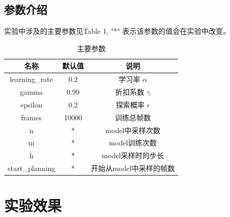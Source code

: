 \documentclass[a4paper,12pt]{article}
\begin{document}
\begin{CJK}{UTF8}{gbsn}
\subsection{参数介绍}
实验中涉及的主要参数见Table 1, "*" 表示该参数的值会在实验中改变。
\begin{table}[!h]
	\renewcommand{\arraystretch}{1.2}
	\caption{主要参数}
	\centering
	\begin{tabular}{ccc}
		\hline
		名称& 默认值& 说明\\
		\hline
		learning\_rate& 0.2 & 学习率 $\alpha$\\
		gamma& 0.99 & 折扣系数 $\gamma$\\
		epsilon& 0.2 & 探索概率 $\epsilon$ \\
		frames& 10000 & 训练总帧数\\
		n& * & model中采样次数\\
		m& * & model训练次数\\
		h& * & model采样时的步长\\
		start\_planning& * & 开始从model中采样的帧数\\
		\hline
	\end{tabular}
\end{table}
\section{实验效果}

\end{CJK}
\end{document}
